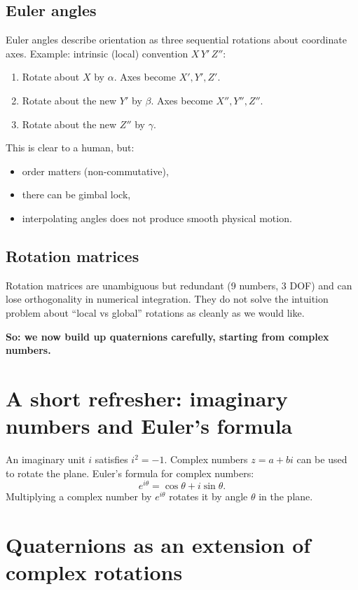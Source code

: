 \documentclass[11pt]{article}
\begin{document}
\subsection{Euler angles}
Euler angles describe orientation as three sequential rotations about coordinate axes. Example: intrinsic (local) convention \(X\,Y'\,Z''\):
\begin{enumerate}
  \item Rotate about \(X\) by \(\alpha\). Axes become \(X',Y',Z'\).
  \item Rotate about the new \(Y'\) by \(\beta\). Axes become \(X'',Y'',Z''\).
  \item Rotate about the new \(Z''\) by \(\gamma\).
\end{enumerate}
This is clear to a human, but:
\begin{itemize}
  \item order matters (non-commutative),
  \item there can be gimbal lock,
  \item interpolating angles does not produce smooth physical motion.
\end{itemize}

\subsection{Rotation matrices}
Rotation matrices are unambiguous but redundant (9 numbers, 3 DOF) and can lose orthogonality in numerical integration. They do not solve the intuition problem about ``local vs global'' rotations as cleanly as we would like.

\vspace{6pt}
\noindent\textbf{So: we now build up quaternions carefully, starting from complex numbers.}

\section{A short refresher: imaginary numbers and Euler's formula}
An imaginary unit \(i\) satisfies \(i^2 = -1\). Complex numbers \(z = a + b i\) can be used to rotate the plane. Euler's formula for complex numbers:
\[
e^{i\theta} = \cos\theta + i\sin\theta.
\]
Multiplying a complex number by \(e^{i\theta}\) rotates it by angle \(\theta\) in the plane.

\section{Quaternions as an extension of complex rotations}
\end{document}
